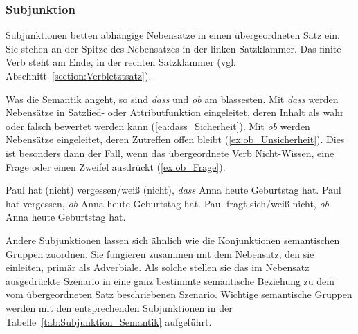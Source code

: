 \subsubsection{Subjunktion}\label{subsubsection:Subjunktion}

Subjunktionen betten abhängige Nebensätze in einen übergeordneten Satz ein. Sie stehen an der Spitze des Nebensatzes in der linken Satzklammer. Das finite Verb steht am Ende, in der rechten Satzklammer (vgl. Abschnitt~\ref{section:Verbletztsatz}). 

Was die Semantik angeht, so sind \textit{dass} und \textit{ob} am blassesten. Mit \textit{dass} werden Nebensätze in Satzlied- oder Attributfunktion eingeleitet, deren Inhalt als wahr oder falsch bewertet werden kann (\ref{ea:dass_Sicherheit}). Mit \textit{ob} werden Nebensätze eingeleitet, deren Zutreffen offen bleibt (\ref{ex:ob_Unsicherheit}). Dies ist besonders dann der Fall, wenn das übergeordnete Verb Nicht-Wissen, eine Frage oder einen Zweifel ausdrückt (\ref{ex:ob_Frage}).

\ea \label{ea:dass_ob_Zutreffen}
\ea \label{ea:dass_Sicherheit} Paul hat (nicht) vergessen/weiß (nicht), \textit{dass} Anna heute Geburtstag hat.
\ex \label{ex:ob_Unsicherheit} Paul hat vergessen, \textit{ob} Anna heute Geburtstag hat. 
\ex \label{ex:ob_Frage} Paul fragt sich/weiß nicht, \textit{ob} Anna heute Geburtstag hat.
\z 
\z 

Andere Subjunktionen lassen sich ähnlich wie die Konjunktionen semantischen Gruppen zuordnen. Sie fungieren zusammen mit dem Nebensatz, den sie einleiten, primär als Adverbiale. Als solche stellen sie das im Nebensatz ausgedrückte Szenario in eine ganz bestimmte semantische Beziehung zu dem vom übergeordneten Satz beschriebenen Szenario. Wichtige semantische Gruppen werden mit den entsprechenden Subjunktionen in der Tabelle~\ref{tab:Subjunktion_Semantik} aufgeführt.

